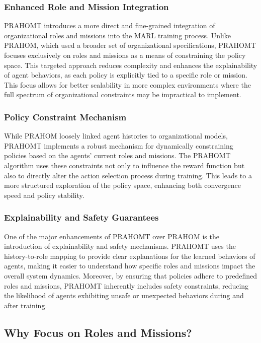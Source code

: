 \documentclass[sigconf,anonymous]{aamas}
\begin{document}
\subsubsection{Enhanced Role and Mission Integration}
PRAHOMT introduces a more direct and fine-grained integration of organizational roles and missions into the MARL training process. Unlike PRAHOM, which used a broader set of organizational specifications, PRAHOMT focuses exclusively on roles and missions as a means of constraining the policy space. This targeted approach reduces complexity and enhances the explainability of agent behaviors, as each policy is explicitly tied to a specific role or mission. This focus allows for better scalability in more complex environments where the full spectrum of organizational constraints may be impractical to implement.

\subsubsection{Policy Constraint Mechanism}
While PRAHOM loosely linked agent histories to organizational models, PRAHOMT implements a robust mechanism for dynamically constraining policies based on the agents' current roles and missions. The PRAHOMT algorithm uses these constraints not only to influence the reward function but also to directly alter the action selection process during training. This leads to a more structured exploration of the policy space, enhancing both convergence speed and policy stability.

\subsubsection{Explainability and Safety Guarantees}
One of the major enhancements of PRAHOMT over PRAHOM is the introduction of explainability and safety mechanisms. PRAHOMT uses the history-to-role mapping to provide clear explanations for the learned behaviors of agents, making it easier to understand how specific roles and missions impact the overall system dynamics. Moreover, by ensuring that policies adhere to predefined roles and missions, PRAHOMT inherently includes safety constraints, reducing the likelihood of agents exhibiting unsafe or unexpected behaviors during and after training.

\subsection{Why Focus on Roles and Missions?}
\end{document}
